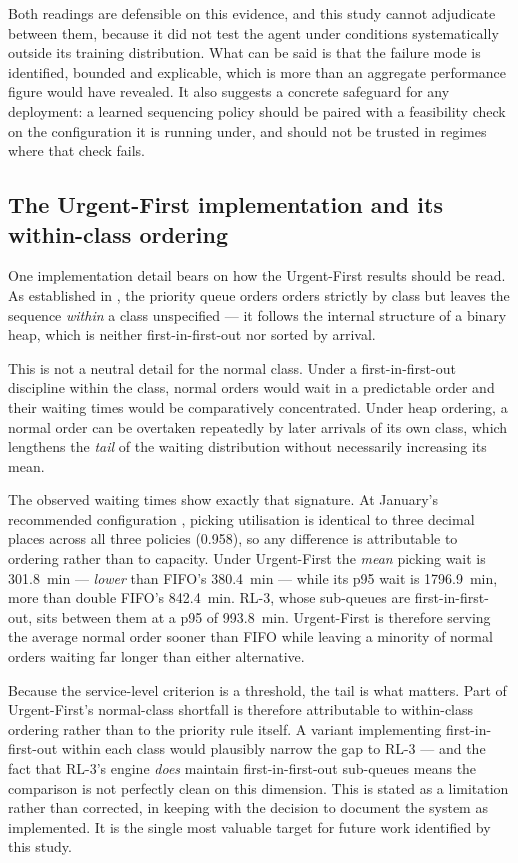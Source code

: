 Both readings are defensible on this evidence, and this study cannot adjudicate between them,
because it did not test the agent under conditions systematically outside its training
distribution. What can be said is that the failure mode is identified, bounded and explicable,
which is more than an aggregate performance figure would have revealed. It also suggests a
concrete safeguard for any deployment: a learned sequencing policy should be paired with a
feasibility check on the configuration it is running under, and should not be trusted in regimes
where that check fails.

\subsection{The Urgent-First implementation and its within-class ordering}
\label{sec:disc-uf-ordering}

One implementation detail bears on how the Urgent-First results should be read. As established
in , the priority queue orders orders strictly by class but leaves the
sequence \emph{within} a class unspecified --- it follows the internal structure of a binary
heap, which is neither first-in-first-out nor sorted by arrival.

This is not a neutral detail for the normal class. Under a first-in-first-out discipline within
the class, normal orders would wait in a predictable order and their waiting times would be
comparatively concentrated. Under heap ordering, a normal order can be overtaken repeatedly by
later arrivals of its own class, which lengthens the \emph{tail} of the waiting distribution
without necessarily increasing its mean.

The observed waiting times show exactly that signature. At January's recommended configuration
, picking utilisation is identical to three decimal places across all three
policies (\num{0.958}), so any difference is attributable to ordering rather than to capacity.
Under Urgent-First the \emph{mean} picking wait is \SI{301.8}{\minute} --- \emph{lower} than
FIFO's \SI{380.4}{\minute} --- while its p95 wait is \SI{1796.9}{\minute}, more than double
FIFO's \SI{842.4}{\minute}. RL-3, whose sub-queues are first-in-first-out, sits between them at
a p95 of \SI{993.8}{\minute}. Urgent-First is therefore serving the average normal order sooner
than FIFO while leaving a minority of normal orders waiting far longer than either alternative.

Because the service-level criterion is a threshold, the tail is what matters. Part of
Urgent-First's normal-class shortfall is therefore attributable to within-class ordering rather
than to the priority rule itself. A variant implementing first-in-first-out within each class
would plausibly narrow the gap to RL-3 --- and the fact that RL-3's engine \emph{does} maintain
first-in-first-out sub-queues means the comparison is not perfectly clean on this dimension.
This is stated as a limitation rather than corrected, in keeping with the decision to document
the system as implemented. It is the single most valuable target for future work identified by
this study.

